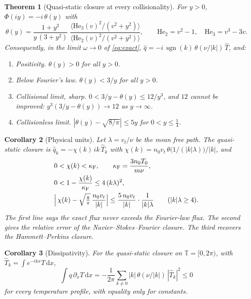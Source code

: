 \documentclass[11pt]{article}
\newcommand{\dd}{\mathrm{d}}
\newcommand{\sgn}{\operatorname{sgn}}
\newcommand{\He}{\mathrm{He}}
\newcommand{\vt}{v_t}
\newtheorem{theorem}{Theorem}
\newtheorem{corollary}[theorem]{Corollary}
\theoremstyle{remark}
\begin{document}
\begin{theorem}[Quasi-static closure at every collisionality]\label{thm:theta}
For $y>0$, $\Phi(iy) = -i\,\theta(y)$ with
\begin{equation}
  \theta(y) = \frac{1+y^2}{y\,(3+y^2)}\;
  \frac{\bigl\langle \He_3(v)^2/(v^2+y^2)\bigr\rangle}
       {\bigl\langle \He_2(v)^2/(v^2+y^2)\bigr\rangle},
  \qquad \He_2 = v^2-1,\quad \He_3 = v^3-3v .
  \label{eq:theta}
\end{equation}
Consequently, in the limit $\omega\to0$ of \eqref{eq:exact},
$\hat q = -i\,\sgn(k)\,\theta(\nu/|k|)\,\hat T$, and:
\begin{enumerate}
  \item[(a)] \emph{Positivity.} $\theta(y)>0$ for all $y>0$.
  \item[(b)] \emph{Below Fourier's law.} $\theta(y) < 3/y$ for all $y>0$.
  \item[(c)] \emph{Collisional limit, sharp.}
    $0 < 3/y - \theta(y) \le 12/y^3$, and $12$ cannot be improved:
    $y^3(3/y-\theta(y))\to12$ as $y\to\infty$.
  \item[(d)] \emph{Collisionless limit.}
    $|\theta(y) - \sqrt{8/\pi}| \le 5y$ for $0<y\le\tfrac14$.
\end{enumerate}
\end{theorem}

\begin{corollary}[Physical units]\label{cor:units}
Let $\lambda = \vt/\nu$ be the mean free path. The quasi-static closure is
$\hat q_k = -\chi(k)\,ik\,\hat T_k$ with
$\chi(k) = n_0\vt\,\theta\bigl(1/(|k|\lambda)\bigr)/|k|$, and
\begin{align*}
  &0 < \chi(k) < \kappa_{\mathrm F}, \qquad
   \kappa_{\mathrm F} = \frac{3n_0T_0}{m\nu}, \\
  &0 < 1 - \frac{\chi(k)}{\kappa_{\mathrm F}} \le 4\,(k\lambda)^2, \\
  &\Bigl|\,\chi(k) - \sqrt{\tfrac{8}{\pi}}\,\frac{n_0\vt}{|k|}\Bigr|
   \le \frac{5\,n_0\vt}{|k|}\cdot\frac{1}{|k|\lambda}
   \qquad (|k|\lambda\ge4).
\end{align*}
The first line says the exact flux never exceeds the Fourier-law flux. The
second gives the relative error of the Navier--Stokes--Fourier closure. The
third recovers the Hammett--Perkins closure.
\end{corollary}

\begin{corollary}[Dissipativity]\label{cor:diss}
For the quasi-static closure on $\mathbb{T} = [0,2\pi)$, with
$\hat T_k = \int e^{-ikx}T\,\dd x$,
\[
  \int q\,\partial_xT\,\dd x
  = -\frac{1}{2\pi}\sum_{k\ne0}|k|\,\theta(\nu/|k|)\,|\hat T_k|^2 \le 0
\]
for every temperature profile, with equality only for constants.
\end{corollary}
\end{document}
